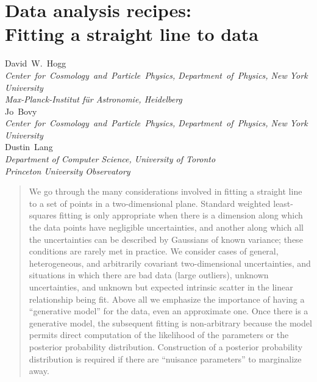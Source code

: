 \documentclass[12pt,twoside]{article}
\newcommand{\affil}[1]{{\footnotesize\textsl{#1}}}
\begin{document}
\thispagestyle{plain}\raggedbottom
\section*{Data analysis recipes:\ \\
  Fitting a straight line to data}

\noindent
David~W.~Hogg\\
\affil{Center~for~Cosmology~and~Particle~Physics, Department~of~Physics, New York University}\\
\affil{Max-Planck-Institut f\"ur Astronomie, Heidelberg}
\\[1ex]
Jo~Bovy\\
\affil{Center~for~Cosmology~and~Particle~Physics, Department~of~Physics, New York University}
\\[1ex]
Dustin~Lang\\
\affil{Department of Computer Science, University of Toronto}\\
\affil{Princeton University Observatory}

\begin{abstract}
  We go through the many considerations involved in fitting a straight
  line to a set of points in a two-dimensional plane.  Standard
  weighted least-squares fitting is only appropriate when there is a
  dimension along which the data points have negligible uncertainties,
  and another along which all the uncertainties can be described by
  Gaussians of known variance; these conditions are rarely met in
  practice.  We consider cases of general, heterogeneous, and
  arbitrarily covariant two-dimensional uncertainties, and situations
  in which there are bad data (large outliers), unknown uncertainties,
  and unknown but expected intrinsic scatter in the linear
  relationship being fit.  Above all we emphasize the importance of
  having a ``generative model'' for the data, even an approximate one.
  Once there is a generative model, the subsequent fitting is
  non-arbitrary because the model permits direct computation of the
  likelihood of the parameters or the posterior probability
  distribution.  Construction of a posterior probability distribution
  is required if there are ``nuisance parameters'' to marginalize
  away.
\end{abstract}
\end{document}
